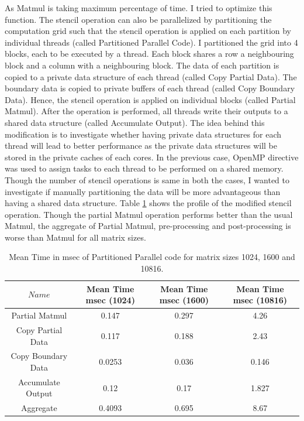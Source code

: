 \documentclass{article}
\begin{document}
\begin{spacing}{1.1}
As Matmul is taking maximum percentage of time. I tried to optimize this function. The stencil operation can also be parallelized by partitioning the computation grid such that the stencil operation is applied on each partition by individual threads (called Partitioned Parallel Code). I partitioned the grid into 4 blocks, each to be executed by a thread. Each block shares a row a neighbouring block and a column with a neighbouring block. The data of each partition is copied to a private data structure of each thread (called Copy Partial Data). The boundary data is copied to private buffers of each thread (called Copy Boundary Data).  Hence, the stencil operation is applied on individual blocks (called Partial Matmul). After the operation is performed, all threads write their outputs to a shared data structure (called Accumulate Output). The idea behind this modification is to investigate whether having private data structures for each thread will lead to better performance as the private data structures will be stored in the private caches of each cores. In the previous case, OpenMP directive was used to assign tasks to each thread to be performed on a shared memory. Though the number of stencil operations is same in both the cases, I wanted to investigate if manually partitioning the data will be more advantageous than having a shared data structure.  Table \ref{partition} shows the profile of the modified stencil operation. Though the partial Matmul operation performs better than the usual Matmul, the aggregate of Partial Matmul, pre-processing and post-processing is worse than Matmul for all matrix sizes.


\begin{table}[H]
\begin{center}
 \begin{tabular}{| c | c|c|c|} 
 \hline
$Name$ & Mean Time msec (1024) & Mean Time msec (1600) & Mean Time msec (10816)    \\ %
 \hline
Partial Matmul & 0.147 &  0.297 & 4.26 \\ %
Copy Partial Data & 0.117 &  0.188 & 2.43 \\ %
Copy Boundary Data & 0.0253 & 0.036 & 0.146 \\ %
Accumulate Output & 0.12 &  0.17 & 1.827 \\ %
\cline{2-4}
Aggregate & 0.4093& 0.695 & 8.67\\%
 \hline
\end{tabular}%
\end{center}
\caption{\label{partition} Mean Time in msec of Partitioned Parallel code for matrix sizes 1024, 1600 and 10816. } 
\end{table}
\\




\end{spacing}
\end{document}
